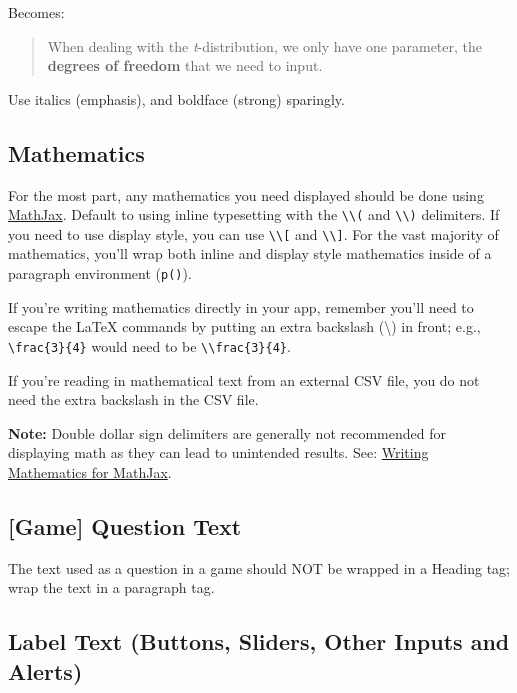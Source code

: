 \documentclass[]{book}
\begin{document}
Becomes:

\begin{quote}
When dealing with the \emph{t}-distribution, we only have one parameter, the \textbf{degrees of freedom} that we need to input.
\end{quote}

Use italics (emphasis), and boldface (strong) sparingly.

\hypertarget{mathematics}{%
\subsection{Mathematics}\label{mathematics}}

For the most part, any mathematics you need displayed should be done using \href{https://www.mathjax.org/}{MathJax}. Default to using inline typesetting with the \texttt{\textbackslash{}\textbackslash{}(} and \texttt{\textbackslash{}\textbackslash{})} delimiters. If you need to use display style, you can use \texttt{\textbackslash{}\textbackslash{}{[}} and \texttt{\textbackslash{}\textbackslash{}{]}}. For the vast majority of mathematics, you'll wrap both inline and display style mathematics inside of a paragraph environment (\texttt{p()}).

If you're writing mathematics directly in your app, remember you'll need to escape the LaTeX commands by putting an extra backslash (\textbackslash{}) in front; e.g., \texttt{\textbackslash{}frac\{3\}\{4\}} would need to be \texttt{\textbackslash{}\textbackslash{}frac\{3\}\{4\}}.

If you're reading in mathematical text from an external CSV file, you do not need the extra backslash in the CSV file.

\textbf{Note:} Double dollar sign delimiters are generally not recommended for displaying math as they can lead to unintended results. See: \href{https://docs.mathjax.org/en/latest/basic/mathematics.html}{Writing Mathematics for MathJax}.

\hypertarget{game-question-text}{%
\subsection{{[}Game{]} Question Text}\label{game-question-text}}

The text used as a question in a game should NOT be wrapped in a Heading tag; wrap the text in a paragraph tag.

\hypertarget{label-text-buttons-sliders-other-inputs-and-alerts}{%
\subsection{Label Text (Buttons, Sliders, Other Inputs and Alerts)}\label{label-text-buttons-sliders-other-inputs-and-alerts}}
\end{document}
